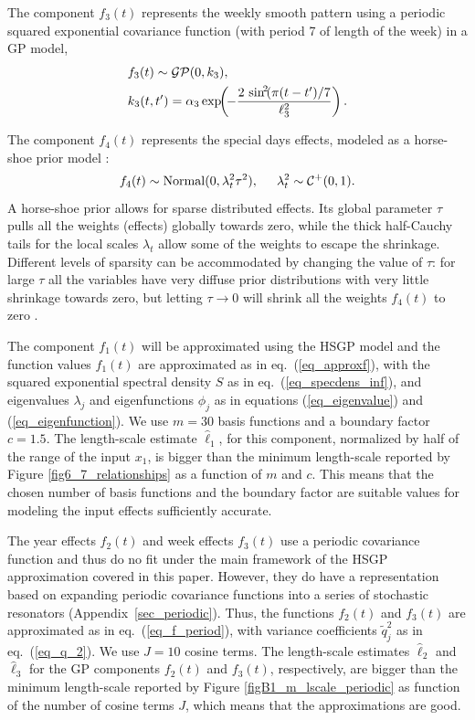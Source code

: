 The component $f_3(t)$ represents the weekly smooth pattern using a periodic squared exponential covariance function (with period 7 of length of the week) in a GP model,
%
\begin{align*}
&f_3(t) \sim \operatorname{\mathcal{GP}}(0,k_3), \\
&k_3(t,t') = \alpha_3 \exp\!\!\left(\!-\frac{2\,\sin^{\!2}\!(\pi(t-t')/7}{\ell_3^2}\right). 
\end{align*}

The component $f_4(t)$ represents the special days effects, modeled as a horse-shoe prior model \citep{carvalho2010,piironen2017sparsity}:
%
\begin{equation*}
f_4(t) \sim \operatorname{Normal}(0,\lambda^2_t \tau^2), \hspace{5mm} \lambda^2_t \sim \mathcal{C}^{+}(0,1).
\end{equation*}
%
A horse-shoe prior allows for sparse distributed effects. Its global parameter $\tau$ pulls all the weights (effects) globally towards zero, while the thick half-Cauchy tails for the local scales $\lambda_t$ allow some of the weights to escape the shrinkage. Different levels of sparsity can be accommodated by changing the value of $\tau$: for large $\tau$ all the variables have very diffuse prior distributions with very little shrinkage towards zero, but letting $\tau \rightarrow 0$ will shrink all the weights $f_4(t)$ to zero \citep{piironen2016hyperprior}. 

The component $f_1(t)$ will be approximated using the HSGP model and the function values $f_1(t)$ are approximated as in eq.~(\ref{eq_approxf}), with the squared exponential spectral density $S$ as in eq.~(\ref{eq_specdens_inf}), and eigenvalues $\lambda_j$ and eigenfunctions $\phi_j$ as in equations (\ref{eq_eigenvalue}) and (\ref{eq_eigenfunction}). We use $m=30$ basis functions and a boundary factor $c=1.5$. The length-scale estimate $\hat{\ell}_1$, for this component, normalized by half of the range of the input $x_1$, is bigger than the minimum length-scale reported by Figure \ref{fig6_7_relationships} as a function of $m$ and $c$. This means that the chosen number of basis functions and the boundary factor are suitable values for modeling the input effects sufficiently accurate. 

The year effects $f_2(t)$ and week effects $f_3(t)$ use a periodic covariance function  and thus do no fit under the main framework of the HSGP approximation covered in this paper. However, they do have a representation based on expanding periodic covariance functions into a series of stochastic resonators (Appendix~\ref{sec_periodic}). Thus, the functions $f_2(t)$ and $f_3(t)$ are approximated as in eq.~(\ref{eq_f_period}), with variance coefficients $\tilde{q}_j^2$ as in eq.~(\ref{eq_q_2}).
We use $J=10$ cosine terms. The length-scale estimates $\hat{\ell}_2$ and $\hat{\ell}_3$ for the GP components $f_2(t)$ and $f_3(t)$, respectively, are bigger than the minimum length-scale reported by Figure \ref{figB1_m_lscale_periodic} as function of the number of cosine terms $J$, which means that the approximations are good.

